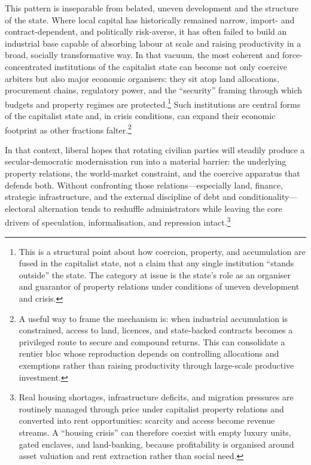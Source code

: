 This pattern is inseparable from belated, uneven development and the structure of the state. Where local
capital has historically remained narrow, import- and contract-dependent, and politically risk-averse, it has
often failed to build an industrial base capable of absorbing labour at scale and raising productivity in a
broad, socially transformative way. In that vacuum, the most coherent and force-concentrated institutions of
the capitalist state can become not only coercive arbiters but also major economic organisers: they sit atop
land allocations, procurement chains, regulatory power, and the ``security'' framing through which budgets and
property regimes are protected.\footnote{This is a structural point about how coercion, property, and accumulation are fused in the capitalist state, not a claim that any single institution ``stands outside'' the state. The category at issue is the state's role as an organiser and guarantor of property relations under conditions of uneven development and crisis.}
Such institutions are central forms of the capitalist state and, in crisis
conditions, can expand their economic footprint as other fractions falter.\footnote{A useful way to frame the mechanism is: when industrial accumulation is constrained, access to land, licences, and state-backed contracts becomes a privileged route to secure and compound returns. This can consolidate a rentier bloc whose reproduction depends on controlling allocations and exemptions rather than raising productivity through large-scale productive investment.}

In that context, liberal hopes that rotating civilian parties will steadily produce a secular-democratic
modernisation run into a material barrier: the underlying property relations, the world-market constraint, and
the coercive apparatus that defends both. Without confronting those relations---especially land, finance,
strategic infrastructure, and the external discipline of debt and conditionality---electoral alternation tends
to reshuffle administrators while leaving the core drivers of speculation, informalisation, and repression
intact.\cite{StrugglePK_WorldPerspectives,PeetUnholyTrinity}\footnote{Real housing shortages, infrastructure deficits, and migration pressures are routinely managed through price under capitalist property relations and converted into rent opportunities: scarcity and access become revenue streams. A ``housing crisis'' can therefore coexist with empty luxury units, gated enclaves, and land-banking, because profitability is organised around asset valuation and rent extraction rather than social need.}

